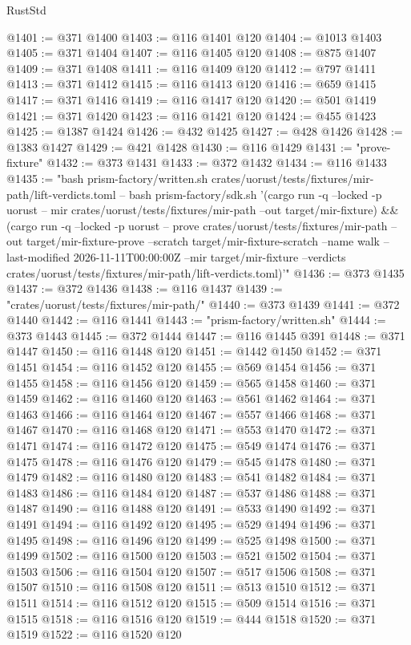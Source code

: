 \begin{lexlean}{RustStd}
\begin{coremodule}
@1401 := @371 @1400
@1403 := @116 @1401 @120
@1404 := @1013 @1403
@1405 := @371 @1404
@1407 := @116 @1405 @120
@1408 := @875 @1407
@1409 := @371 @1408
@1411 := @116 @1409 @120
@1412 := @797 @1411
@1413 := @371 @1412
@1415 := @116 @1413 @120
@1416 := @659 @1415
@1417 := @371 @1416
@1419 := @116 @1417 @120
@1420 := @501 @1419
@1421 := @371 @1420
@1423 := @116 @1421 @120
@1424 := @455 @1423
@1425 := @1387 @1424
@1426 := @432 @1425
@1427 := @428 @1426
@1428 := @1383 @1427
@1429 := @421 @1428
@1430 := @116 @1429
@1431 := "prove-fixture"
@1432 := @373 @1431
@1433 := @372 @1432
@1434 := @116 @1433
@1435 := "bash prism-factory/written.sh crates/uorust/tests/fixtures/mir-path/lift-verdicts.toml -- bash prism-factory/sdk.sh '(cargo run -q --locked -p uorust -- mir crates/uorust/tests/fixtures/mir-path --out target/mir-fixture) && (cargo run -q --locked -p uorust -- prove crates/uorust/tests/fixtures/mir-path --out target/mir-fixture-prove --scratch target/mir-fixture-scratch --name walk --last-modified 2026-11-11T00:00:00Z --mir target/mir-fixture --verdicts crates/uorust/tests/fixtures/mir-path/lift-verdicts.toml)'"
@1436 := @373 @1435
@1437 := @372 @1436
@1438 := @116 @1437
@1439 := "crates/uorust/tests/fixtures/mir-path/"
@1440 := @373 @1439
@1441 := @372 @1440
@1442 := @116 @1441
@1443 := "prism-factory/written.sh"
@1444 := @373 @1443
@1445 := @372 @1444
@1447 := @116 @1445 @391
@1448 := @371 @1447
@1450 := @116 @1448 @120
@1451 := @1442 @1450
@1452 := @371 @1451
@1454 := @116 @1452 @120
@1455 := @569 @1454
@1456 := @371 @1455
@1458 := @116 @1456 @120
@1459 := @565 @1458
@1460 := @371 @1459
@1462 := @116 @1460 @120
@1463 := @561 @1462
@1464 := @371 @1463
@1466 := @116 @1464 @120
@1467 := @557 @1466
@1468 := @371 @1467
@1470 := @116 @1468 @120
@1471 := @553 @1470
@1472 := @371 @1471
@1474 := @116 @1472 @120
@1475 := @549 @1474
@1476 := @371 @1475
@1478 := @116 @1476 @120
@1479 := @545 @1478
@1480 := @371 @1479
@1482 := @116 @1480 @120
@1483 := @541 @1482
@1484 := @371 @1483
@1486 := @116 @1484 @120
@1487 := @537 @1486
@1488 := @371 @1487
@1490 := @116 @1488 @120
@1491 := @533 @1490
@1492 := @371 @1491
@1494 := @116 @1492 @120
@1495 := @529 @1494
@1496 := @371 @1495
@1498 := @116 @1496 @120
@1499 := @525 @1498
@1500 := @371 @1499
@1502 := @116 @1500 @120
@1503 := @521 @1502
@1504 := @371 @1503
@1506 := @116 @1504 @120
@1507 := @517 @1506
@1508 := @371 @1507
@1510 := @116 @1508 @120
@1511 := @513 @1510
@1512 := @371 @1511
@1514 := @116 @1512 @120
@1515 := @509 @1514
@1516 := @371 @1515
@1518 := @116 @1516 @120
@1519 := @444 @1518
@1520 := @371 @1519
@1522 := @116 @1520 @120

\end{coremodule}
\end{lexlean}
